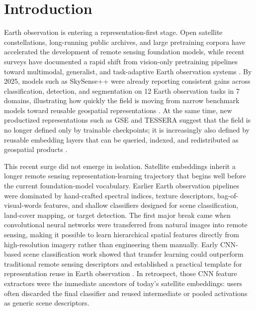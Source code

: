 \section{Introduction}

Earth observation is entering a representation-first stage. Open satellite constellations, long-running public archives, and large pretraining corpora have accelerated the development of remote sensing foundation models, while recent surveys have documented a rapid shift from vision-only pretraining pipelines toward multimodal, generalist, and task-adaptive Earth observation systems \citep{survey1,survey3,survey4}. By 2025, models such as SkySense++ were already reporting consistent gains across classification, detection, and segmentation on 12 Earth observation tasks in 7 domains, illustrating how quickly the field is moving from narrow benchmark models toward reusable geospatial representations \citep{skysensepp}. At the same time, new productized representations such as GSE and TESSERA suggest that the field is no longer defined only by trainable checkpoints; it is increasingly also defined by reusable embedding layers that can be queried, indexed, and redistributed as geospatial products \citep{gse,tessera}.

This recent surge did not emerge in isolation. Satellite embeddings inherit a longer remote sensing representation-learning trajectory that begins well before the current foundation-model vocabulary. Earlier Earth observation pipelines were dominated by hand-crafted spectral indices, texture descriptors, bag-of-visual-words features, and shallow classifiers designed for scene classification, land-cover mapping, or target detection. The first major break came when convolutional neural networks were transferred from natural images into remote sensing, making it possible to learn hierarchical spatial features directly from high-resolution imagery rather than engineering them manually. Early CNN-based scene classification work showed that transfer learning could outperform traditional remote sensing descriptors and established a practical template for representation reuse in Earth observation \citep{castelluccio2015}. In retrospect, those CNN feature extractors were the immediate ancestors of today's satellite embeddings: users often discarded the final classifier and reused intermediate or pooled activations as generic scene descriptors.

